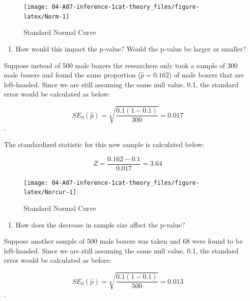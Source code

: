 \documentclass[
]{report}
\providecommand{\tightlist}{%
  \setlength{\itemsep}{0pt}\setlength{\parskip}{0pt}}
\begin{document}
\begin{figure}

{\centering \texttt{[image: 04-A07-inference-1cat-theory\_files/figure-latex/Norm-1]} 

}

\caption{Standard Normal Curve}\label{fig:Norm}
\end{figure}

\begin{enumerate}
\def\labelenumi{\arabic{enumi}.}
\setcounter{enumi}{10}
\tightlist
\item
  How would this impact the p-value? Would the p-value be larger or smaller?
\end{enumerate}

\vspace{0.2in}

Suppose instead of 500 male boxers the researchers only took a sample of 300 male boxers and found the same proportion (\(\hat{p}=0.162\)) of male boxers that are left-handed. Since we are still assuming the same null value, 0.1, the standard error would be calculated as below:

\[SE_0(\hat{p})=\sqrt{\frac{0.1(1-0.1)}{300}} = 0.017\].

The standardized statistic for this new sample is calculated below:

\[Z = \frac{0.162-0.1}{0.017} = 3.64\]

\begin{figure}

{\centering \texttt{[image: 04-A07-inference-1cat-theory\_files/figure-latex/Norcur-1]} 

}

\caption{Standard Normal Curve}\label{fig:Norcur}
\end{figure}

\begin{enumerate}
\def\labelenumi{\arabic{enumi}.}
\setcounter{enumi}{11}
\tightlist
\item
  How does the decrease in sample size affect the p-value?
\end{enumerate}

\vspace{0.3in}

Suppose another sample of 500 male boxers was taken and 68 were found to be left-handed. Since we are still assuming the same null value, 0.1, the standard error would be calculated as before:

\[SE_0(\hat{p})=\sqrt{\frac{0.1(1-0.1)}{500}} = 0.013\].
\end{document}
